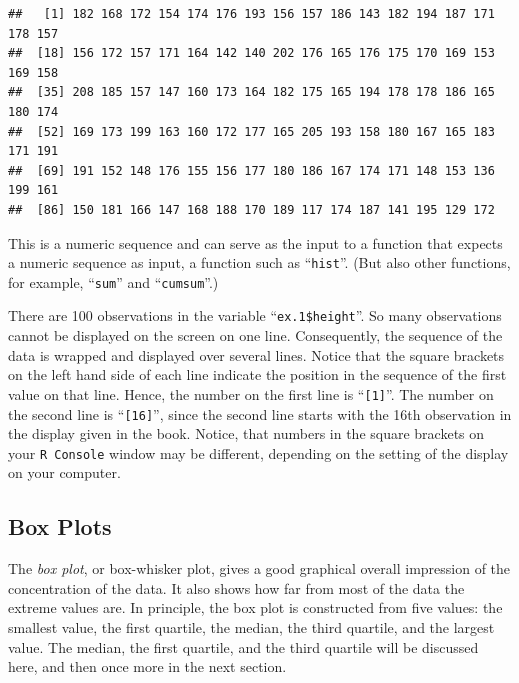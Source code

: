 \documentclass[]{krantz}
\makeatletter
\newenvironment{Shaded}{\begin{snugshade}}{\end{snugshade}}
\newcommand{\FloatTok}[1]{\textcolor[rgb]{0.00,0.00,0.81}{#1}}
\newcommand{\NormalTok}[1]{#1}
\newcommand{\OperatorTok}[1]{\textcolor[rgb]{0.81,0.36,0.00}{\textbf{#1}}}
\newenvironment{kframe}{%
\medskip{}
\setlength{\fboxsep}{.8em}
 \def\at@end@of@kframe{}%
 \ifinner\ifhmode%
  \def\at@end@of@kframe{\end{minipage}}%
  \begin{minipage}{\columnwidth}%
 \fi\fi%
 \def\FrameCommand##1{\hskip\@totalleftmargin \hskip-\fboxsep
 \colorbox{shadecolor}{##1}\hskip-\fboxsep
     \hskip-\linewidth \hskip-\@totalleftmargin \hskip\columnwidth}%
 \MakeFramed {\advance\hsize-\width
   \@totalleftmargin\z@ \linewidth\hsize
   \@setminipage}}%
 {\par\unskip\endMakeFramed%
 \at@end@of@kframe}
\renewenvironment{Shaded}{\begin{kframe}}{\end{kframe}}
\theoremstyle{definition}
\theoremstyle{definition}
\theoremstyle{definition}
\theoremstyle{remark}
\makeatother
\begin{document}
\begin{Shaded}
\end{Shaded}

\begin{verbatim}
##   [1] 182 168 172 154 174 176 193 156 157 186 143 182 194 187 171 178 157
##  [18] 156 172 157 171 164 142 140 202 176 165 176 175 170 169 153 169 158
##  [35] 208 185 157 147 160 173 164 182 175 165 194 178 178 186 165 180 174
##  [52] 169 173 199 163 160 172 177 165 205 193 158 180 167 165 183 171 191
##  [69] 191 152 148 176 155 156 177 180 186 167 174 171 148 153 136 199 161
##  [86] 150 181 166 147 168 188 170 189 117 174 187 141 195 129 172
\end{verbatim}

This is a numeric sequence and can serve as the input to a function that
expects a numeric sequence as input, a function such as ``\texttt{hist}''. (But
also other functions, for example, ``\texttt{sum}'' and ``\texttt{cumsum}''.)

There are 100 observations in the variable ``\texttt{ex.1\$height}''. So many
observations cannot be displayed on the screen on one line.
Consequently, the sequence of the data is wrapped and displayed over
several lines. Notice that the square brackets on the left hand side of
each line indicate the position in the sequence of the first value on
that line. Hence, the number on the first line is ``\texttt{{[}1{]}}''. The number on
the second line is ``\texttt{{[}16{]}}'', since the second line starts with the 16th
observation in the display given in the book. Notice, that numbers in
the square brackets on your \texttt{R\ Console} window may be different,
depending on the setting of the display on your computer.

\hypertarget{box-plots}{%
\subsection{Box Plots}\label{box-plots}}

The \emph{box plot}, or box-whisker plot, gives a good graphical overall
impression of the concentration of the data. It also shows how far from
most of the data the extreme values are. In principle, the box plot is
constructed from five values: the smallest value, the first quartile,
the median, the third quartile, and the largest value. The median, the
first quartile, and the third quartile will be discussed here, and then
once more in the next section.
\end{document}
